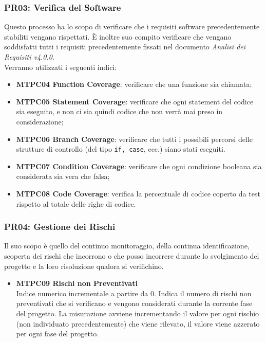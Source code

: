 \subsubsection{PR03: Verifica del Software}\label{MetricheVerifica}
Questo processo ha lo scopo di verificare che i requisiti software precedentemente stabiliti vengano rispettati. È inoltre suo compito verificare che vengano soddisfatti
tutti i requisiti precedentemente fissati nel documento \textit{Analisi dei Requisiti v4.0.0}. \-\\ Verranno utilizzati i seguenti indici:

\begin{itemize}
	\item \textbf{MTPC04 Function Coverage}: verificare che una funzione sia chiamata;
	\item \textbf{MTPC05 Statement Coverage}: verificare che ogni statement del codice sia eseguito, e non ci sia quindi codice che non verrà mai preso in considerazione;
	\item \textbf{MTPC06 Branch Coverage}: verificare che tutti i possibili percorsi delle strutture di controllo (del tipo \texttt{if, case}, ecc.) siano stati eseguiti.
	\item \textbf{MTPC07 Condition Coverage}: verificare che ogni condizione booleana sia considerata sia vera che falsa;
	\item \textbf{MTPC08 Code Coverage}: verifica la percentuale di codice coperto da test rispetto al totale delle righe di codice.
\end{itemize}

\subsubsection{PR04: Gestione dei Rischi}
Il suo scopo è quello del continuo monitoraggio, della continua identificazione, scoperta dei rischi che incorrono o che posso incorrere durante lo svolgimento del progetto e la loro risoluzione qualora si verifichino.
\begin{itemize}

\item \textbf{MTPC09 Rischi non Preventivati}\-\\
Indice numerico incrementale a partire da 0. Indica il numero di rischi non preventivati che si verificano e vengono considerati durante la corrente fase del progetto. La misurazione avviene incrementando il valore per ogni rischio (non individuato precedentemente) che viene rilevato, il valore viene azzerato per ogni fase del progetto.

\end{itemize}

